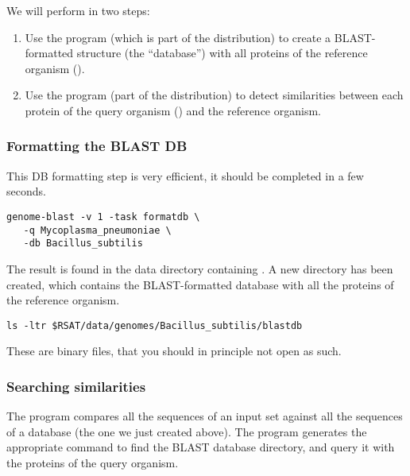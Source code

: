We will perform in two steps:

\begin{enumerate}
\item Use the program  (which is part of the
   distribution) to create a BLAST-formatted structure
  (the ``database'') with all proteins of the reference organism
  ().
\item Use the program  (part of the 
  distribution) to detect similarities between each protein of the
  query organism () and the reference
  organism.
\end{enumerate}

\subsubsection{Formatting the BLAST DB}

This DB formatting step is very efficient, it should be completed in a
few seconds.

\begin{footnotesize}
\begin{verbatim}
genome-blast -v 1 -task formatdb \
   -q Mycoplasma_pneumoniae \
   -db Bacillus_subtilis 
\end{verbatim}
\end{footnotesize}

The result is found in the data directory containing
. A new directory  has been
created, which contains the BLAST-formatted database with all the
proteins of the reference organism.

\begin{footnotesize}
\begin{verbatim}
ls -ltr $RSAT/data/genomes/Bacillus_subtilis/blastdb
\end{verbatim}
\end{footnotesize}

These are binary files, that you should in principle not open as such.

\subsubsection{Searching similarities}

The program  compares all the sequences of an input
set against all the sequences of a database (the one we just created
above). The program \program{genome-blast} generates the appropriate
\program{blastall} command to find the BLAST database directory, and
query it with the proteins of the query organism.

